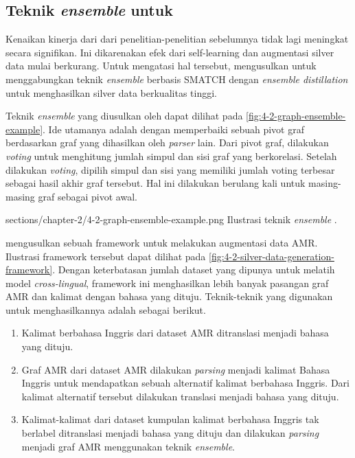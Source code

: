 \subsection{Teknik \textit{ensemble} untuk \amrparsing{}}

Kenaikan kinerja dari \amrparsing{} dari penelitian-penelitian sebelumnya tidak lagi meningkat secara signifikan.
Ini dikarenakan efek dari self-learning dan augmentasi silver data mulai berkurang.
Untuk mengatasi hal tersebut, \textcite{lee2022} mengusulkan untuk menggabungkan teknik \textit{ensemble} berbasis \gls{SMATCH}  dengan \textit{ensemble distillation} untuk menghasilkan silver data berkualitas tinggi.

Teknik \textit{ensemble} yang diusulkan oleh \textcite{hoang2021} dapat dilihat pada \cref{fig:4-2-graph-ensemble-example}.
Ide utamanya adalah dengan memperbaiki sebuah pivot graf berdasarkan graf yang dihasilkan oleh \textit{parser} lain.
Dari pivot graf, dilakukan \textit{voting} untuk menghitung jumlah simpul dan sisi graf yang berkorelasi.
Setelah dilakukan \textit{voting}, dipilih simpul dan sisi yang memiliki jumlah voting terbesar sebagai hasil akhir graf tersebut.
Hal ini dilakukan berulang kali untuk masing-masing graf sebagai pivot awal.

  {sections/chapter-2/4-2-graph-ensemble-example.png}
  {Ilustrasi teknik \textit{ensemble} .}

\textcite{lee2022} mengusulkan sebuah framework untuk melakukan augmentasi data \gls{AMR}.
Ilustrasi framework tersebut dapat dilihat pada \cref{fig:4-2-silver-data-generation-framework}.
Dengan keterbatasan jumlah dataset yang dipunya untuk melatih model \textit{cross-lingual}, framework ini menghasilkan lebih banyak pasangan graf \gls{AMR} dan kalimat dengan bahasa yang dituju.
Teknik-teknik yang digunakan untuk menghasilkannya adalah sebagai berikut.
\begin{enumerate}
  \item Kalimat berbahasa Inggris dari dataset \gls{AMR} ditranslasi menjadi bahasa yang dituju.

  \item Graf \gls{AMR} dari dataset \gls{AMR} dilakukan \textit{parsing} menjadi kalimat Bahasa Inggris untuk mendapatkan sebuah alternatif kalimat berbahasa Inggris.
  Dari kalimat alternatif tersebut dilakukan translasi menjadi bahasa yang dituju.

  \item Kalimat-kalimat dari dataset kumpulan kalimat berbahasa Inggris tak berlabel ditranslasi menjadi bahasa yang dituju dan dilakukan \textit{parsing} menjadi graf \gls{AMR} menggunakan teknik \textit{ensemble}.
\end{enumerate}

